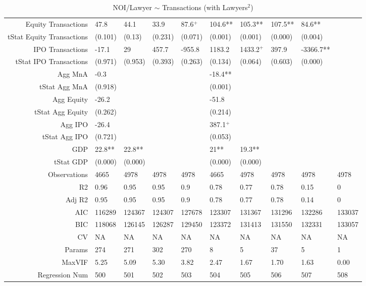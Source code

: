 \begin{table}[ht]
\begin{tabular}{rlllllllll}
  Equity Transactions & 47.8 & 44.1 & 33.9 & 87.6$^{+}$ & 104.6** & 105.3** & 107.5** & 84.6** &  \\ 
  tStat Equity Transactions & (0.101) & (0.13) & (0.231) & (0.071) & (0.001) & (0.001) & (0.000) & (0.004) &  \\ 
  IPO Transactions & -17.1 & 29 & 457.7 & -955.8 & 1183.2 & 1433.2$^{+}$ & 397.9 & -3366.7** &  \\ 
  tStat IPO Transactions & (0.971) & (0.953) & (0.393) & (0.263) & (0.134) & (0.064) & (0.603) & (0.000) &  \\ 
  Agg MnA & -0.3 &  &  &  & -18.4** &  &  &  &  \\ 
  tStat Agg MnA & (0.918) &  &  &  & (0.001) &  &  &  &  \\ 
  Agg Equity & -26.2 &  &  &  & -51.8 &  &  &  &  \\ 
  tStat Agg Equity & (0.262) &  &  &  & (0.214) &  &  &  &  \\ 
  Agg IPO & -26.4 &  &  &  & 387.1$^{+}$ &  &  &  &  \\ 
  tStat Agg IPO & (0.721) &  &  &  & (0.053) &  &  &  &  \\ 
  GDP & 22.8** & 22.8** &  &  & 21** & 19.3** &  &  &  \\ 
  tStat GDP & (0.000) & (0.000) &  &  & (0.000) & (0.000) &  &  &  \\ 
  Observations & 4665 & 4978 & 4978 & 4978 & 4665 & 4978 & 4978 & 4978 & 4978 \\ 
  R2 & 0.96 & 0.95 & 0.95 & 0.9 & 0.78 & 0.77 & 0.78 & 0.15 & 0 \\ 
  Adj R2 & 0.95 & 0.95 & 0.95 & 0.9 & 0.78 & 0.77 & 0.78 & 0.14 & 0 \\ 
  AIC & 116289 & 124367 & 124307 & 127678 & 123307 & 131367 & 131296 & 132286 & 133037 \\ 
  BIC & 118068 & 126145 & 126287 & 129450 & 123372 & 131413 & 131550 & 132331 & 133057 \\ 
  CV & NA & NA & NA & NA & NA & NA & NA & NA & NA \\ 
  Params & 274 & 271 & 302 & 270 & 8 & 5 & 37 & 5 & 1 \\ 
  MaxVIF & 5.25 & 5.09 & 5.30 & 3.82 & 2.47 & 1.67 & 1.70 & 1.63 & 0.00 \\ 
  Regression Num & 500 & 501 & 502 & 503 & 504 & 505 & 506 & 507 & 508 \\ 
   \hline
\end{tabular}
\caption{NOI/Lawyer $\sim$ Transactions (with Lawyers$^2$)} 
\end{table}
